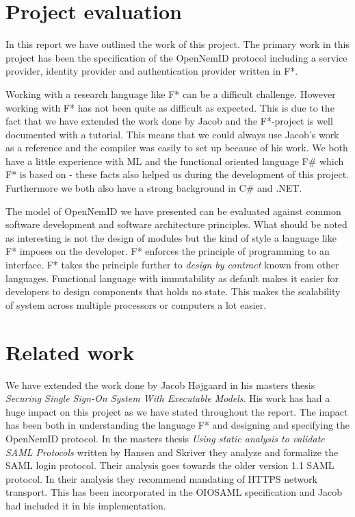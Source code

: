 \documentclass[twosided]{report}
\begin{document}
\section{Project evaluation}
In this report we have outlined the work of this project. The primary work in this project has been the specification of the OpenNemID protocol including a service provider, identity provider and authentication provider written in F*.
\par
Working with a research language like F* can be a difficult challenge. However working with F* has not been quite as difficult as expected. This is due to the fact that we have extended the work done by Jacob and the F*-project is well documented with a tutorial. This means that we could always use Jacob's work as a reference and the compiler was easily to set up because of his work. We both have a little experience with ML and the functional oriented language F\# which F* is based on - these facts also helped us during the development of this project. Furthermore we both also have a strong background in C\# and .NET.
\par
The model of OpenNemID we have presented can be evaluated against common software development and software architecture principles. What should be noted as interesting is not the design of modules but the kind of style a language like F* imposes on the developer. F* enforces the principle of programming to an interface. F* takes the principle further to \emph{design by contract} known from other languages. Functional language with immutability as default makes it easier for developers to design components that holds no state. This makes the scalability of system across multiple processors or computers a lot easier.

\section{Related work}
We have extended the work done by Jacob H{\o}jgaard \cite{jacob} in his masters thesis \emph{Securing Single Sign-On System With Executable Models}. His work has had a huge impact on this project as we have stated throughout the report. The impact has been both in understanding the language F* and designing and specifying the OpenNemID protocol. In the masters thesis \emph{Using static analysis to validate SAML Protocols} written by Hansen and Skriver \cite{HansenSkriver} they analyze and formalize the SAML login protocol. Their analysis goes towards the older version 1.1 SAML protocol. In their analysis they recommend mandating of HTTPS network transport. This has been incorporated in the OIOSAML specification and Jacob had included it in his implementation.
\end{document}

